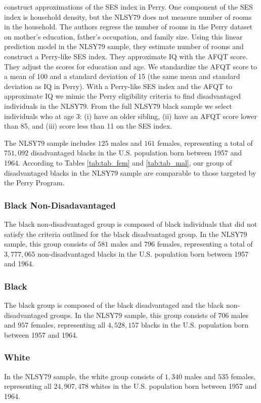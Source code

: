 \citet{heckman2010analyzing} construct approximations of the SES index in Perry. One component of the SES index is household density, but the NLSY79 does not measure number of rooms in the household. The authors regress the number of rooms in the Perry dataset on mother's education, father's occupation, and family size. Using this linear prediction model in the NLSY79 sample, they estimate number of rooms and construct a Perry-like SES index. They approximate IQ with the AFQT score. They adjust the scores for education and age. We standardize the AFQT score to a mean of 100 and a standard deviation of 15 (the same mean and standard deviation as IQ in Perry). With a Perry-like SES index and the AFQT to approximate IQ we mimic the Perry eligibility criteria to find disadvantaged individuals in the NLSY79. From the full NLSY79 black sample we select individuals who at age 3: (i) have an older sibling, (ii) have an AFQT score lower than 85, and (iii) score less than 11 on the SES index.

The NLSY79 sample includes $125$ males and $161$ females, representing a total of $751,092$ disadvantaged blacks in the U.S. population born between 1957 and 1964. According to Tables \ref{tab:tab_fem} and \ref{tab:tab_mal}, our group of disadvantaged blacks in the NLSY79 sample are comparable to those targeted by the Perry Program. 


\subsubsection*{Black Non-Disadavantaged}
The black non-disadvantaged group is composed of black individuals that did not satisfy the criteria outlined for the black disadvantaged group. In the NLSY79 sample, this group consists of $581$ males and $796$ females, representing a total of $3,777,065$ non-disadvantaged blacks in the U.S. population born between 1957 and 1964.

\subsubsection*{Black}
The black group is composed of the black disadvantaged and the black non-disadvantaged groups. In the NLSY79 sample, this group consists of $706$ males and $957$ females, representing all $4,528,157$ blacks in the U.S. population born between 1957 and 1964. 

\subsubsection*{White}
In the NLSY79 sample, the white group consists of $1,340$ males and $535$ females, representing all $24,907,478$ whites in the U.S. population born between 1957 and 1964.

